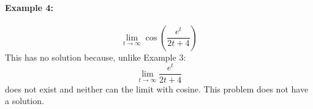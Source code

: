 \documentclass[../revisedMain.tex]{subfiles}
\begin{document}
\paragraph{Example 4:} \[\lim_{t\to\infty}\cos\left(\frac{e^t}{2t+4}\right)\] This has no solution because, unlike Example 3: \[\lim_{t\to\infty}\frac{e^t}{2t+4}\] does not exist and neither can the limit with cosine. This problem does not have a solution.\\
\end{document}
